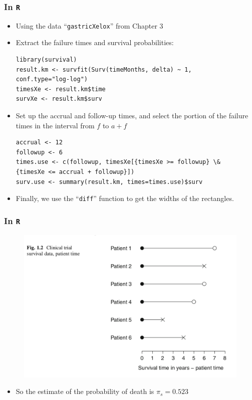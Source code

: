 \documentclass{beamer}
\begin{document}
\pagebreak
\begin{frame}[fragile]
\frametitle{In \texttt{R}}
\begin{itemize}
\item Using the data ``\texttt{gastricXelox}'' from Chapter 3
\item Extract the failure times and survival probabilities:
\begin{Verbatim}
library(survival)
result.km <- survfit(Surv(timeMonths, delta) ~ 1,
conf.type="log-log") 
timesXe <- result.km$time 
survXe <- result.km$surv
\end{Verbatim}
\item Set up the accrual and follow-up times, and select the portion of the failure times in the interval from $f$ to $a+f$ 
\begin{Verbatim}
accrual <- 12
followup <- 6
times.use <- c(followup, timesXe[{timesXe >= followup} \&
{timesXe <= accrual + followup}])
surv.use <- summary(result.km, times=times.use)$surv
\end{Verbatim}
\item Finally, we use the ``\texttt{diff}'' function to get the widths of the rectangles.
\end{itemize}
\end{frame}

\pagebreak
\begin{frame}[fragile]
\frametitle{In \texttt{R}}
\begin{figure}[h!]
\includegraphics[scale = .3]{002.png}
\end{figure}
\begin{itemize}
\begin{Verbatim}
> surv.simpson <- summary(result.km,
times=c(followup, accrual/2 + followup, accrual+followup))
> surv.simpson$surv
[1] 0.6458333 0.4782609 0.3034080
#We evaluate the probability of death:
> pi.simpson <- 1 - (1/6)*(surv.simpson[1] + 4*surv.simpson[2] + 
surv.simpson[3])
> pi.simpson
[1] 0.5229525
\end{Verbatim}
\item So the estimate of the probability of death is $\pi_s = 0.523$
\end{itemize}
\end{frame}
\end{document}
